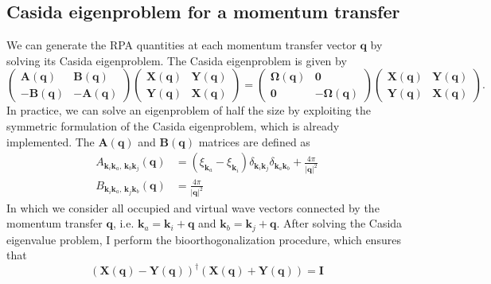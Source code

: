 \subsection{Casida eigenproblem for a momentum transfer}
We can generate the RPA quantities at each momentum transfer vector $\bm{q}$ by solving its Casida eigenproblem. The Casida eigenproblem is given by
\begin{equation}
    \begin{pmatrix}
        \bm{A}(\bm{q}) & \bm{B}(\bm{q}) \\
        -\bm{B}(\bm{q}) & -\bm{A}(\bm{q})
    \end{pmatrix}
    \begin{pmatrix}
        \bm{X}(\bm{q}) & \bm{Y}(\bm{q}) \\
        \bm{Y}(\bm{q}) & \bm{X}(\bm{q})
    \end{pmatrix}
=
    \begin{pmatrix}
        \bm{\Omega}(\bm{q}) & \bm{0} \\
        \bm{0} & -\bm{\Omega}(\bm{q})
    \end{pmatrix}
 \begin{pmatrix}
        \bm{X}(\bm{q}) & \bm{Y}(\bm{q}) \\
        \bm{Y}(\bm{q}) & \bm{X}(\bm{q})
    \end{pmatrix}.
    \label{eqn:casida_eq}
\end{equation}
In practice, we can solve an eigenproblem of half the size by exploiting the symmetric formulation of the Casida eigenproblem, which is already implemented.
The $\bm{A}(\bm{q})$ and $\bm{B}(\bm{q})$ matrices are defined as
\begin{align}
    A_{\bm{k}_i \bm{k}_a,\, \bm{k}_b \bm{k}_j }(\bm{q}) &= \left(\xi_{\bm{k}_a}-\xi_{\bm{k}_i}\right) \delta_{\bm{k}_i \bm{k}_j} \delta_{\bm{k}_a \bm{k}_b} + \frac{4\pi}{|\bm{q}|^2} \\
    B_{\bm{k}_i \bm{k}_a,\, \bm{k}_j \bm{k}_b}(\bm{q}) &= \frac{4\pi}{|\bm{q}|^2}
\end{align}
In which we consider all occupied and virtual wave vectors connected by the momentum transfer $\bm{q}$, i.e. $\bm{k}_a = \bm{k}_i + \bm{q}$ and $\bm{k}_b = \bm{k}_j + \bm{q}$. 
After solving the Casida eigenvalue problem, I perform the bioorthogonalization procedure, which ensures that
\begin{equation}
    \left(\bm{X}(\bm{q}) - \bm{Y}(\bm{q})\right)^\dagger \left(\bm{X}(\bm{q}) + \bm{Y}(\bm{q})\right) = \bm{I}
\end{equation}
